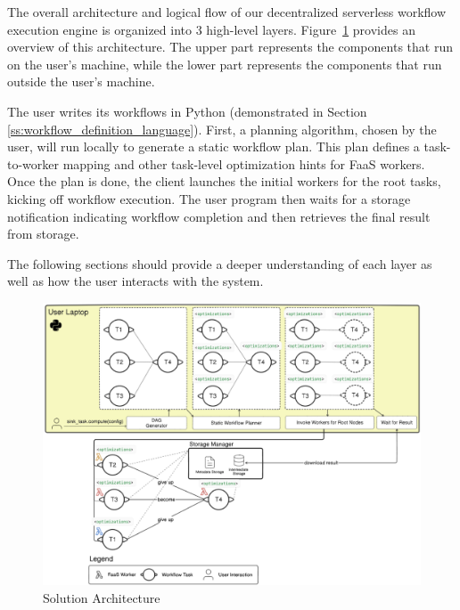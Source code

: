 \documentclass[conference]{IEEEtran}
\begin{document}
The overall architecture and logical flow of our decentralized serverless workflow execution engine is organized into 3 high-level layers. Figure~\ref{fig:solution_architecture} provides an overview of this architecture. The upper part represents the components that run on the user's machine, while the lower part represents the components that run outside the user's machine. 

The user writes its workflows in Python (demonstrated in Section \ref{ss:workflow_definition_language}). First, a planning algorithm, chosen by the user, will run locally to generate a static workflow plan. This plan defines a task-to-worker mapping and other task-level optimization hints for FaaS workers. Once the plan is done, the client launches the initial workers for the root tasks, kicking off workflow execution. The user program then waits for a storage notification indicating workflow completion and then retrieves the final result from storage.

The following sections should provide a deeper understanding of each layer as well as how the user interacts with the system.

\begin{figure}[h]
  \centering
  \includegraphics[width=\columnwidth]{figures/solution_distributedarchintegrated.png}
  \caption{Solution Architecture}
  \label{fig:solution_architecture}
\end{figure}
\end{document}
